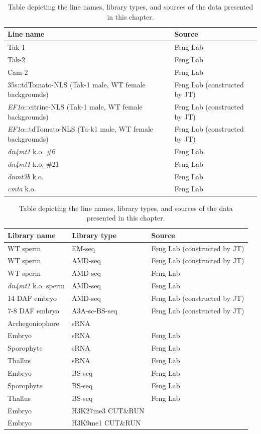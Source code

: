 \begin{table}[htbp]
\centering
\begin{tabular}{|p{6cm}|p{3cm}|p{4cm}|} %
\hline
\textbf{Line name} &  & \textbf{Source} \\
\hline
Tak-1 & & Feng Lab \\
Tak-2 & & Feng Lab \\
Cam-2 & & Feng Lab \\
35s::tdTomato-NLS (Tak-1 male, WT female backgrounds) & & Feng Lab (constructed by JT) \\
\textit{EF1$\alpha$}::citrine-NLS (Tak-1 male, WT female backgrounds) & & Feng Lab (constructed by JT) \\
\textit{EF1$\alpha$}::tdTomato-NLS (Ta-k1 male, WT female backgrounds) & & Feng Lab (constructed by JT) \\
\textit{dn4mt1} k.o. \#6 & & Feng Lab \cite{RN189} \\
\textit{dn4mt1} k.o. \#21 & & Feng Lab \cite{RN189} \\
\textit{dnmt3b} k.o. & & Feng Lab \cite{RN189} \\
\textit{cmta} k.o. & & Feng Lab \cite{RN189} \\
\hline
\end{tabular}
\begin{tabular}{|p{6cm}|p{3cm}|p{4cm}|}
\hline
\textbf{Library name} & \textbf{Library type} & \textbf{Source} \\
\hline
WT sperm & EM-seq & Feng Lab (constructed by JT) \\
WT sperm & AMD-seq & Feng Lab (constructed by JT) \\
WT sperm & AMD-seq & Feng Lab \\
\textit{dn4mt1} k.o. sperm & AMD-seq & Feng Lab \\
14 DAF embryo & AMD-seq & Feng Lab (constructed by JT) \\
7-8 DAF embryo & A3A-sc-BS-seq & Feng Lab (constructed by JT) \\
\hline
Archegoniophore & sRNA & \cite{RN308} \\
Embryo & sRNA & Feng Lab \\
Sporophyte & sRNA & Feng Lab \\
Thallus & sRNA & Feng Lab \\
\hline
Embryo & BS-seq & Feng Lab \\
Sporophyte & BS-seq & Feng Lab \\
Thallus & BS-seq & Feng Lab \\
Embryo & H3K27me3 CUT\&RUN & \cite{RN160} \\
Embryo & H3K9me1 CUT\&RUN & \cite{RN160} \\
\hline
\end{tabular}
\caption{Table depicting the line names, library types, and sources of the data presented in this chapter.}
\label{ch3:workbyothers}
\end{table}


